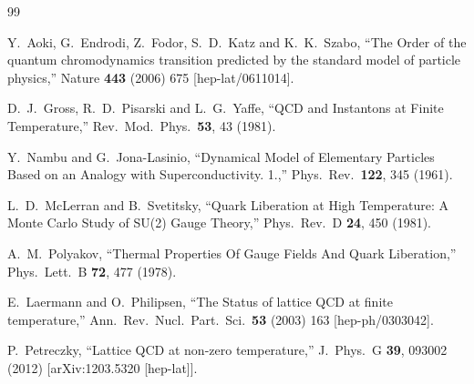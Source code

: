 \documentclass[11pt,a4paper,psfrag]{article}
\begin{document}

\begin{thebibliography}{99}

  Y.~Aoki, G.~Endrodi, Z.~Fodor, S.~D.~Katz and K.~K.~Szabo,
  ``The Order of the quantum chromodynamics transition predicted by the standard model of particle physics,''
  Nature {\bf 443} (2006) 675
  [hep-lat/0611014].

  D.~J.~Gross, R.~D.~Pisarski and L.~G.~Yaffe,
  ``QCD and Instantons at Finite Temperature,''
  Rev.\ Mod.\ Phys.\  {\bf 53}, 43 (1981).

  Y.~Nambu and G.~Jona-Lasinio,
  ``Dynamical Model of Elementary Particles Based on an Analogy with Superconductivity. 1.,''
  Phys.\ Rev.\  {\bf 122}, 345 (1961).

  L.~D.~McLerran and B.~Svetitsky,
  ``Quark Liberation at High Temperature: A Monte Carlo Study of SU(2) Gauge Theory,''
  Phys.\ Rev.\ D {\bf 24}, 450 (1981).

  A.~M.~Polyakov,
  ``Thermal Properties Of Gauge Fields And Quark Liberation,''
  Phys.\ Lett.\  B {\bf 72}, 477 (1978).

  E.~Laermann and O.~Philipsen,
  ``The Status of lattice QCD at finite temperature,''
  Ann.\ Rev.\ Nucl.\ Part.\ Sci.\  {\bf 53} (2003) 163
  [hep-ph/0303042].

  P.~Petreczky,
  ``Lattice QCD at non-zero temperature,''
  J.\ Phys.\ G {\bf 39}, 093002 (2012)
  [arXiv:1203.5320 [hep-lat]].


\end{thebibliography}
\end{document}
